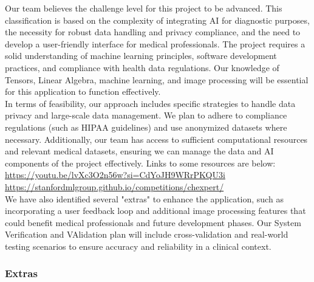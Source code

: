 \documentclass[12pt, titlepage]{article}
\begin{document}
Our team believes the challenge level for this project to be advanced. This classification is based on the complexity of integrating AI for diagnostic purposes, the necessity for robust data handling and privacy compliance, and the need to develop a user-friendly interface for medical professionals. The project requires a solid understanding of machine learning principles, software development practices, and compliance with health data regulations. Our knowledge of Tensors, Linear Algebra, machine learning, and image processing will be essential for this application to function effectively. \\
In terms of feasibility, our approach includes specific strategies to handle data privacy and large-scale data management. We plan to adhere to compliance regulations (such as HIPAA guidelines) and use anonymized datasets where necessary. Additionally, our team has access to sufficient computational resources and relevant medical datasets, ensuring we can manage the data and AI components of the project effectively. Links to some resources are below:\\
\url{https://youtu.be/lvXc3O2n56w?si=CdYoJH9WRrPKQU3i}
\url{https://stanfordmlgroup.github.io/competitions/chexpert/} \\ 
We have also identified several "extras" to enhance the application, such as incorporating a user feedback loop and additional image processing features that could benefit medical professionals and future development phases. Our System Verification and VAlidation plan will include cross-validation and real-world testing scenarios to ensure accuracy and reliability in a clinical context. \\
\subsubsection{Extras}
\end{document}
